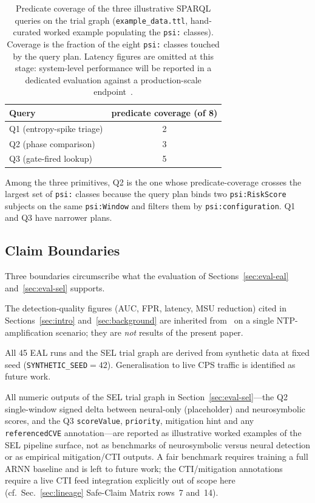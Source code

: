 \documentclass[futureinternet,article,submit,pdftex,moreauthors]{Definitions/mdpi}
\begin{document}
\begin{table}[t]
\centering
\caption{Predicate coverage of the three illustrative SPARQL queries
on the trial graph (\texttt{example\_data.ttl}, hand-curated worked
example populating the \texttt{psi:} classes). Coverage is the
fraction of the eight \texttt{psi:} classes touched by the query plan.
Latency figures are omitted at this stage: system-level performance
will be reported in a dedicated evaluation against a production-scale
endpoint~\cite{paper5}.}
\label{tab:sparql-perf}
\small
\begin{tabular}{@{}lc@{}}
\toprule
Query & predicate coverage (of 8) \\
\midrule
Q1 (entropy-spike triage)   & 2 \\
Q2 (phase comparison)       & 3 \\
Q3 (gate-fired lookup)      & 5 \\
\bottomrule
\end{tabular}
\end{table}

\noindent
Among the three primitives, Q2 is the one whose predicate-coverage
crosses the largest set of \texttt{psi:} classes because
the query plan binds two \texttt{psi:RiskScore} subjects on the same
\texttt{psi:Window} and filters them by \texttt{psi:configuration}. Q1
and Q3 have narrower plans.

\subsection{Claim Boundaries}
\label{sec:claim-boundaries}

Three boundaries circumscribe what the evaluation of
Sections~\ref{sec:eval-eal} and~\ref{sec:eval-sel} supports.

\begin{description}[leftmargin=*,style=nextline]
\item[B1 (Inherited vs.\ new).] The detection-quality figures (AUC, FPR,
latency, MSU reduction) cited in Sections~\ref{sec:intro}
and~\ref{sec:background} are inherited from~\cite{paper3} on a single
NTP-amplification scenario; they are \emph{not} results of the present
paper.
\item[B2 (Synthetic vs.\ live).] All 45 EAL runs and the SEL trial graph
are derived from synthetic data at fixed seed
(\texttt{SYNTHETIC\_SEED}$=42$). Generalisation to live CPS traffic is
identified as future work.
\item[B3 (Illustrative vs.\ benchmark).] All numeric outputs of the SEL
trial graph in Section~\ref{sec:eval-sel}---the Q2 single-window signed
delta between neural-only (placeholder) and neurosymbolic scores, and
the Q3 \texttt{scoreValue}, \texttt{priority}, mitigation hint and any
\texttt{referencedCVE} annotation---are reported as illustrative worked
examples of the SEL pipeline surface, not as benchmarks of
neurosymbolic versus neural detection or as empirical
mitigation/CTI outputs. A fair benchmark requires training a full ARNN
baseline and is left to future work; the CTI/mitigation annotations
require a live CTI feed integration explicitly out of scope here
(cf.\ Sec.~\ref{sec:lineage} Safe-Claim Matrix rows~7 and~14).
\end{description}
\end{document}
